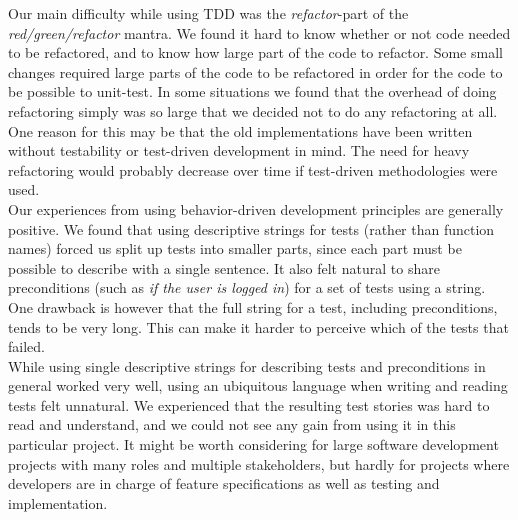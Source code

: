 Our main difficulty while using TDD was the \emph{refactor}-part of the
\emph{red/green/refactor} mantra. We found it hard to know whether or
not code needed to be refactored, and to know how large part of the code
to refactor. Some small changes required large parts of the code to be
refactored in order for the code to be possible to unit-test. In some
situations we found that the overhead of doing refactoring simply was so
large that we decided not to do any refactoring at all. One reason for
this may be that the old implementations have been written without
testability or test-driven development in mind. The need for heavy
refactoring would probably decrease over time if test-driven
methodologies were used.\\

Our experiences from using behavior-driven development principles are
generally positive. We found that using descriptive strings for tests
(rather than function names) forced us split up tests into smaller
parts, since each part must be possible to describe with a single
sentence. It also felt natural to share preconditions (such as \emph{if
the user is logged in}) for a set of tests using a string. One drawback
is however that the full string for a test, including preconditions,
tends to be very long. This can make it harder to perceive which of the
tests that failed.\\

While using single descriptive strings for describing tests and
preconditions in general worked very well, using an ubiquitous language
when writing and reading tests felt unnatural. We experienced that the
resulting test stories was hard to read and understand, and we could not
see any gain from using it in this particular project. It might be worth
considering for large software development projects with many roles and
multiple stakeholders, but hardly for projects where developers are in
charge of feature specifications as well as testing and
implementation.\\
